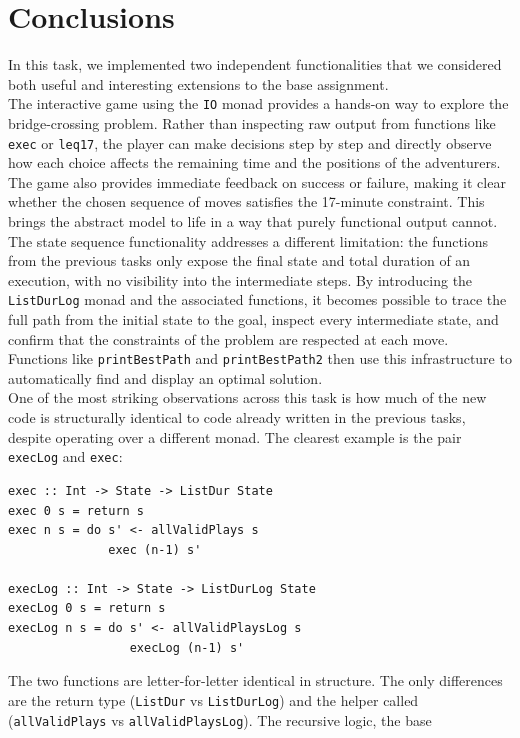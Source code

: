 \documentclass[a4paper,12pt]{report}
\begin{document}
\section{Conclusions}
In this task, we implemented two independent functionalities that we considered both
useful and interesting extensions to the base assignment.
\\[1em]
The interactive game using the \texttt{IO} monad provides a hands-on way to explore
the bridge-crossing problem. Rather than inspecting raw output from functions like
\texttt{exec} or \texttt{leq17}, the player can make decisions step by step and
directly observe how each choice affects the remaining time and the positions of the
adventurers. The game also provides immediate feedback on success or failure, making
it clear whether the chosen sequence of moves satisfies the 17-minute constraint.
This brings the abstract model to life in a way that purely functional output cannot.
\\[1em]
The state sequence functionality addresses a different limitation: the functions from
the previous tasks only expose the final state and total duration of an execution,
with no visibility into the intermediate steps. By introducing the \texttt{ListDurLog}
monad and the associated functions, it becomes possible to trace the full path from
the initial state to the goal, inspect every intermediate state, and confirm that the
constraints of the problem are respected at each move. Functions like
\texttt{printBestPath} and \texttt{printBestPath2} then use this infrastructure to
automatically find and display an optimal solution.
\\[1em]
One of the most striking observations across this task is how much of the new code
is structurally identical to code already written in the previous tasks, despite
operating over a different monad. The clearest example is the pair
\texttt{execLog} and \texttt{exec}:
\begin{verbatim}
exec :: Int -> State -> ListDur State
exec 0 s = return s
exec n s = do s' <- allValidPlays s
              exec (n-1) s'
 
execLog :: Int -> State -> ListDurLog State
execLog 0 s = return s
execLog n s = do s' <- allValidPlaysLog s
                 execLog (n-1) s'
\end{verbatim}
The two functions are letter-for-letter identical in structure. The only differences
are the return type (\texttt{ListDur} vs \texttt{ListDurLog}) and the helper called
(\texttt{allValidPlays} vs \texttt{allValidPlaysLog}). The recursive logic, the base
\end{document}
